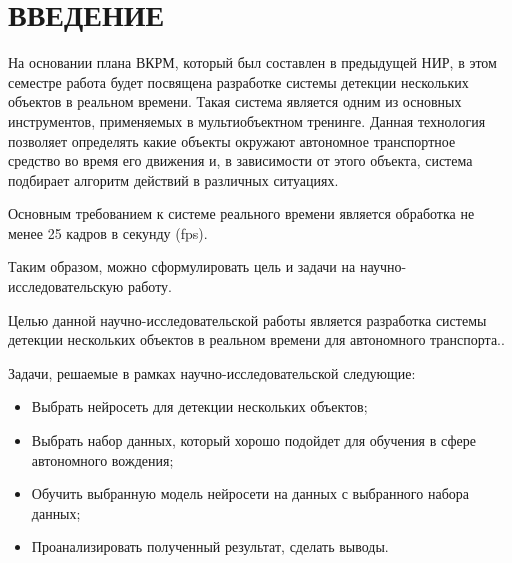 \chapter*{ВВЕДЕНИЕ}

На основании плана ВКРМ, который был составлен в предыдущей НИР, в этом семестре 
работа будет посвящена разработке системы детекции нескольких объектов в 
реальном времени. Такая система является одним из основных инструментов, применяемых
в мультиобъектном тренинге. Данная технология позволяет определять какие объекты
окружают автономное транспортное средство во время его движения и, в зависимости от
этого объекта, система подбирает алгоритм действий в различных ситуациях. 

Основным требованием к системе реального времени является обработка не менее 25 кадров 
в секунду (fps).

Таким образом, можно сформулировать цель и задачи на научно-исследовательскую работу. 

Целью данной научно-исследовательской работы является разработка системы детекции нескольких объектов в реальном времени для автономного транспорта..

Задачи, решаемые в рамках научно-исследовательской следующие:

\begin{itemize}

	\item Выбрать нейросеть для детекции нескольких объектов;

	\item Выбрать набор данных, который хорошо подойдет для обучения в сфере автономного вождения;
	
 	\item Обучить выбранную модель нейросети на данных с выбранного набора данных;
	
	\item Проанализировать полученный результат, сделать выводы.
	
\end{itemize}

